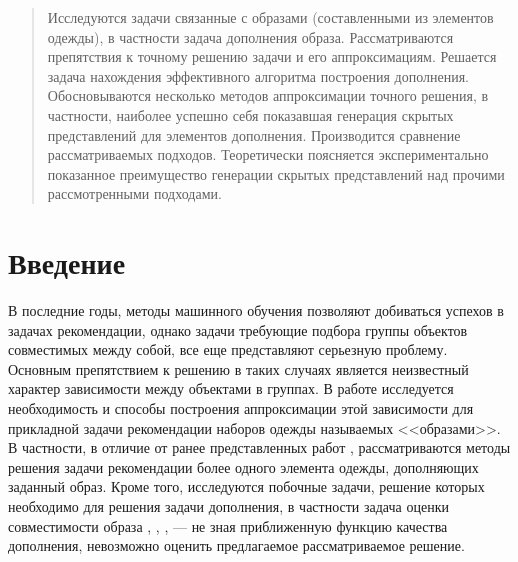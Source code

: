 \documentclass[a4paper,14pt]{extarticle}
\begin{document}
	\vspace*{\fill}
	\begin{abstract}	
	 	Исследуются задачи связанные с образами (составленными из элементов одежды), в частности задача дополнения образа. Рассматриваются препятствия к точному решению задачи и его аппроксимациям. Решается задача нахождения эффективного алгоритма построения дополнения. Обосновываются несколько методов аппроксимации точного решения, в частности, наиболее успешно себя показавшая генерация скрытых представлений для элементов дополнения. Производится сравнение рассматриваемых подходов. Теоретически поясняется экспериментально показанное преимущество генерации скрытых представлений над прочими рассмотренными подходами.
	\end{abstract}
	\vspace*{\fill}
\newpage
	
	\section{Введение}
		В последние годы, методы машинного обучения позволяют добиваться успехов в задачах рекомендации, однако задачи требующие подбора группы объектов совместимых между собой, все еще представляют серьезную проблему. Основным препятствием к решению в таких случаях является неизвестный характер зависимости между объектами в группах. В работе исследуется необходимость и способы построения аппроксимации этой зависимости для прикладной задачи рекомендации наборов одежды называемых <<образами>>. 
		В частности, в отличие от ранее представленных работ \cite{https://doi.org/10.48550/arXiv.1908.11754} \cite{https://doi.org/10.48550/arXiv.2005.12566}  \cite{https://doi.org/10.48550/arXiv.2204.04812}, рассматриваются методы решения задачи рекомендации более одного элемента одежды, дополняющих заданный образ. Кроме того, исследуются побочные задачи, решение которых необходимо для решения задачи дополнения, в частности задача оценки совместимости образа \cite{Wang_2019}, \cite{su2021complementary}, \cite{Cui_2019}, \cite{balim2023diagnosing}	--- не зная приближенную функцию качества дополнения, невозможно оценить предлагаемое рассматриваемое решение.
		
\end{document}
